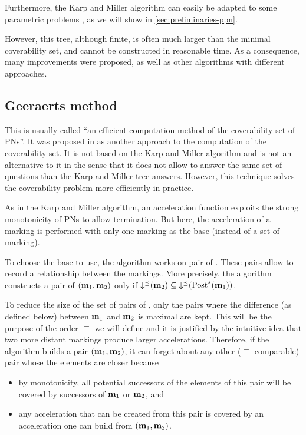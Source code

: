 Furthermore, the Karp and Miller algorithm can easily be adapted to some parametric problems \cite{David17}, as we will show in \autoref{sec:preliminaries-ppn}.

However, this tree, although finite, is often much larger than the minimal coverability set, and cannot be constructed in reasonable time.
As a consequence, many improvements were proposed, as well as other algorithms with different approaches.

\subsection{Geeraerts method}
\label{sec:eff}

This is usually called ``an efficient computation method of the coverability set of \acp{PN}''.
It was proposed in \cite{Geeraerts07thesis, Geeraerts07} as another approach to the computation of the coverability set.
It is not based on the Karp and Miller algorithm and is not an alternative to it in the sense that it does not allow to answer the same set of questions than the Karp and Miller tree answers.
However, this technique solves the coverability problem more efficiently in practice.

As in the Karp and Miller algorithm, an acceleration function exploits the strong monotonicity of \acp{PN} to allow termination.
But here, the acceleration of a marking is performed with only one marking as the base (instead of a set of marking).

To choose the base to use, the algorithm works on pair of \omarks.
These pairs allow to record a relationship between the markings.
More precisely, the algorithm constructs a pair of \omarks $(\mathbf{m}_1, \mathbf{m}_2)$ only if $\operatorname{\downarrow^\preceq}(\mathbf{m}_2) \subseteq \operatorname{\downarrow^\preceq}(\operatorname{Post}^*(\mathbf{m}_1))$.

To reduce the size of the set of pairs of \omarks, only the pairs where the difference (as defined below) between $\mathbf{m}_1$ and $\mathbf{m}_2$ is maximal are kept.
This will be the purpose of the order $\sqsubseteq$ we will define and it is justified by the intuitive idea that two more distant markings produce larger accelerations.
Therefore, if the algorithm builds a pair $(\mathbf{m}_1, \mathbf{m}_2)$, it can forget about any other ($\sqsubseteq$-comparable) pair whose the elements are closer because
\begin{itemize}
  \item by monotonicity, all potential successors of the elements of this pair will be covered by successors of $\mathbf{m}_1$ or $\mathbf{m}_2$, and
  \item any acceleration that can be created from this pair is covered by an acceleration one can build from $(\mathbf{m}_1, \mathbf{m}_2)$.
\end{itemize}

